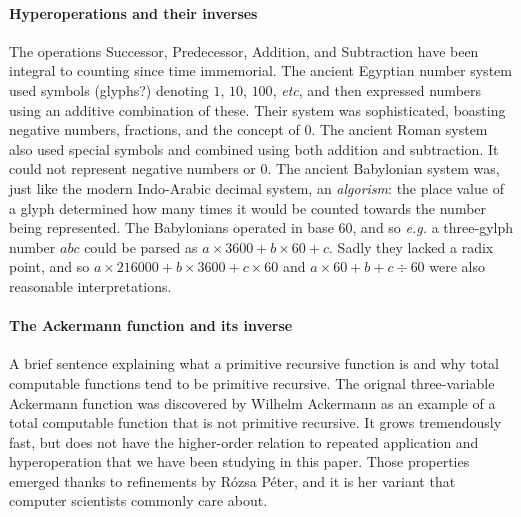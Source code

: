 \label{sec:related}

\paragraph*{Hyperoperations and their inverses}

The operations Successor, Predecessor, Addition, and Subtraction have
been integral to counting since time immemorial. The ancient Egyptian 
number system used symbols {\color{blue}(glyphs?)} denoting $1$, $10$, $100$, \emph{etc}, 
and then expressed numbers using an additive combination of these.
{\color{magenta}Their system was sophisticated, boasting negative numbers, fractions, 
and  the concept of $0$.} The ancient Roman system 
also used special symbols and combined using both addition and subtraction.
{\color{magenta}It could not represent negative numbers or $0$.}
The ancient Babylonian system was, just like the modern Indo-Arabic decimal system,
an \emph{algorism}: the place value of a glyph determined how many times it would 
be counted towards the number being represented. The Babylonians operated in 
base $60$, and so \emph{e.g.} a three-gylph number $abc$ could be parsed as $a \times 3600 + b \times 60 + c$. {\color{magenta}Sadly they lacked a radix point, and so 
$a \times 216000 + b \times 3600 + c \times 60$ and $a \times 60 + b + c \div 60$ were also
reasonable interpretations.}



\paragraph*{The Ackermann function and its inverse}
{\color{magenta}A brief sentence explaining what a primitive recursive function is and 
why total computable functions tend to be primitive recursive.}
The orignal three-variable Ackermann function was discovered by 
Wilhelm Ackermann as an example of a total computable function that 
is not primitive recursive. It grows tremendously fast, but does not have the higher-order
relation to repeated application and hyperoperation that we have been studying in
this paper. Those properties emerged thanks to refinements by Rózsa Péter, and it is 
her variant that computer scientists commonly care about.

